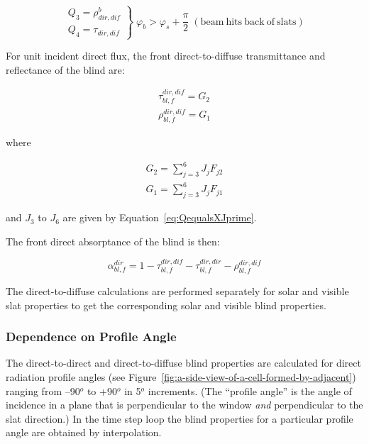 \begin{equation}
\left.
    \begin{array}{l}
      Q_3 = \rho_{dir,dif}^b \\
      Q_4 = \tau_{dir,dif}
    \end{array}
  \right\}
  \;
  \varphi_b > \varphi_s + \frac{\pi }{2}
  \;
  \mathrm{ (beam~hits~back~of~slats)}
\end{equation}

For unit incident direct flux, the front direct-to-diffuse transmittance and reflectance of the blind are:

\begin{equation}
  \begin{array}{l}
    \tau_{bl,f}^{dir,dif} = {G_2} \\
    \rho_{bl,f}^{dir,dif} = {G_1}
  \end{array}
\end{equation}

where

\begin{equation}
  \begin{array}{l}
    G_2 = \sum_{j = 3}^6 J_j F_{j2} \\
    G_1 = \sum_{j = 3}^6 J_j F_{j1}
  \end{array}
\end{equation}

and \({J_3}\) to \({J_6}\) are given by Equation~\ref{eq:QequalsXJprime}.

The front direct absorptance of the blind is then:

\begin{equation}
\alpha_{bl,f}^{dir} = 1 - \tau_{bl,f}^{dir,dif} - \tau_{bl,f}^{dir,dir} - \rho_{bl,f}^{dir,dif}
\end{equation}

The direct-to-diffuse calculations are performed separately for solar and visible slat properties to get the corresponding solar and visible blind properties.

\subsubsection{Dependence on Profile Angle}\label{dependence-on-profile-angle}

The direct-to-direct and direct-to-diffuse blind properties are calculated for direct radiation profile angles (see Figure~\ref{fig:a-side-view-of-a-cell-formed-by-adjacent}) ranging from --90\(^{o}\) to +90\(^{o}\) in 5\(^{o}\) increments. (The ``profile angle'' is the angle of incidence in a plane that is perpendicular to the window \emph{and} perpendicular to the slat direction.) In the time step loop the blind properties for a particular profile angle are obtained by interpolation.

